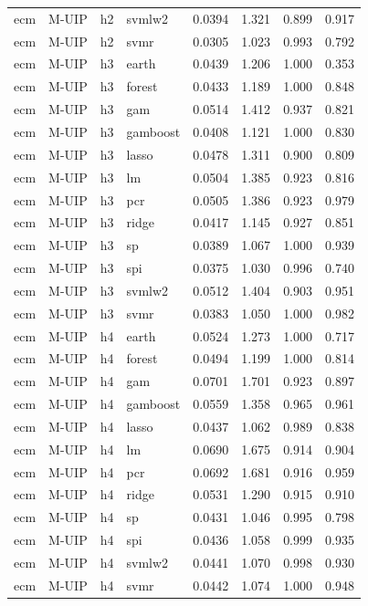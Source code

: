 \begin{ThreePartTable}
\begin{longtable}[t]{llclcccc}
ecm & M-UIP & h2 & svmlw2 & 0.0394 & 1.321 & 0.899 & 0.917\\
ecm & M-UIP & h2 & svmr & 0.0305 & 1.023 & 0.993 & 0.792\\
\addlinespace
ecm & M-UIP & h3 & earth & 0.0439 & 1.206 & 1.000 & 0.353\\
ecm & M-UIP & h3 & forest & 0.0433 & 1.189 & 1.000 & 0.848\\
ecm & M-UIP & h3 & gam & 0.0514 & 1.412 & 0.937 & 0.821\\
ecm & M-UIP & h3 & gamboost & 0.0408 & 1.121 & 1.000 & 0.830\\
ecm & M-UIP & h3 & lasso & 0.0478 & 1.311 & 0.900 & 0.809\\
ecm & M-UIP & h3 & lm & 0.0504 & 1.385 & 0.923 & 0.816\\
ecm & M-UIP & h3 & pcr & 0.0505 & 1.386 & 0.923 & 0.979\\
ecm & M-UIP & h3 & ridge & 0.0417 & 1.145 & 0.927 & 0.851\\
ecm & M-UIP & h3 & sp & 0.0389 & 1.067 & 1.000 & 0.939\\
ecm & M-UIP & h3 & spi & 0.0375 & 1.030 & 0.996 & 0.740\\
ecm & M-UIP & h3 & svmlw2 & 0.0512 & 1.404 & 0.903 & 0.951\\
ecm & M-UIP & h3 & svmr & 0.0383 & 1.050 & 1.000 & 0.982\\
\addlinespace
ecm & M-UIP & h4 & earth & 0.0524 & 1.273 & 1.000 & 0.717\\
ecm & M-UIP & h4 & forest & 0.0494 & 1.199 & 1.000 & 0.814\\
ecm & M-UIP & h4 & gam & 0.0701 & 1.701 & 0.923 & 0.897\\
ecm & M-UIP & h4 & gamboost & 0.0559 & 1.358 & 0.965 & 0.961\\
ecm & M-UIP & h4 & lasso & 0.0437 & 1.062 & 0.989 & 0.838\\
ecm & M-UIP & h4 & lm & 0.0690 & 1.675 & 0.914 & 0.904\\
ecm & M-UIP & h4 & pcr & 0.0692 & 1.681 & 0.916 & 0.959\\
ecm & M-UIP & h4 & ridge & 0.0531 & 1.290 & 0.915 & 0.910\\
ecm & M-UIP & h4 & sp & 0.0431 & 1.046 & 0.995 & 0.798\\
ecm & M-UIP & h4 & spi & 0.0436 & 1.058 & 0.999 & 0.935\\
ecm & M-UIP & h4 & svmlw2 & 0.0441 & 1.070 & 0.998 & 0.930\\
ecm & M-UIP & h4 & svmr & 0.0442 & 1.074 & 1.000 & 0.948\\

\end{longtable}
\end{ThreePartTable}
